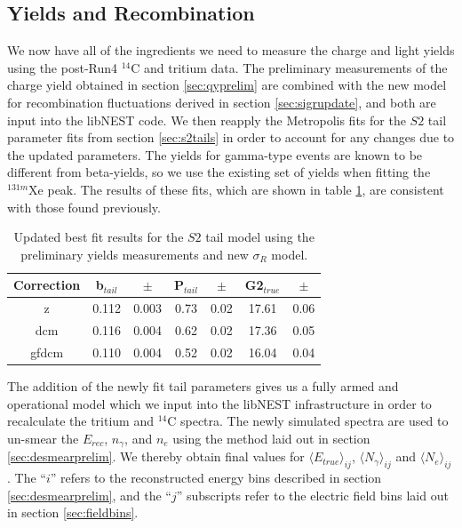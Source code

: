 \subsection{Yields and Recombination}\label{sec:qyfinal}
We now have all of the ingredients we need to measure the charge and light yields using the post-Run4 $^{14}$C and tritium data. The preliminary measurements of the charge yield obtained in section \ref{sec:qyprelim} are combined with the new model for recombination fluctuations derived in section \ref{sec:sigrupdate}, and both are input into the libNEST code. We then reapply the Metropolis fits for the $S2$ tail parameter fits from section \ref{sec:s2tails} in order to account for any changes due to the updated parameters. The yields for gamma-type events are known to be different from beta-yields, so we use the existing set of yields when fitting the $^{131m}$Xe peak. The results of these fits, which are shown in table \ref{tab:s2bestfit_new}, are consistent with those found previously.
\begin{table}[h!]
\centering
    \begin{tabular}{ c | c | c | c | c | c | c }
    \hline
    Correction & b$_{tail}$ & $\pm$ & P$_{tail}$ & $\pm$  & G2$_{true}$ & $\pm$ \\
    \hline \hline
    z & 0.112 & 0.003 & 0.73 & 0.02 & 17.61 & 0.06\\
    \hline
    dcm & 0.116 & 0.004 & 0.62 & 0.02 & 17.36 & 0.05 \\
    \hline
    gfdcm & 0.110 & 0.004 & 0.52 & 0.02 & 16.04 & 0.04 \\
    \hline
    \end{tabular}
    \caption{Updated best fit results for the $S2$ tail model using the preliminary yields measurements and new $\sigma_R$ model.}
    \label{tab:s2bestfit_new}
\end{table}

The addition of the newly fit tail parameters gives us a fully armed and operational model which we input into the libNEST infrastructure in order to recalculate the tritium and $^{14}$C spectra. The newly simulated spectra are used to un-smear the $E_{rec}$, $n_{\gamma}$, and $n_e$ using the method laid out in section \ref{sec:desmearprelim}. We thereby obtain final values for $\langle E_{true} \rangle_{ij}$, $\langle N_{\gamma} \rangle_{ij}$ and $\langle N_{e} \rangle_{ij}$. The ``$i$'' refers to the reconstructed energy bins described in section  \ref{sec:desmearprelim}, and the ``$j$'' subscripts refer to the electric field bins laid out in section \ref{sec:fieldbins}.

